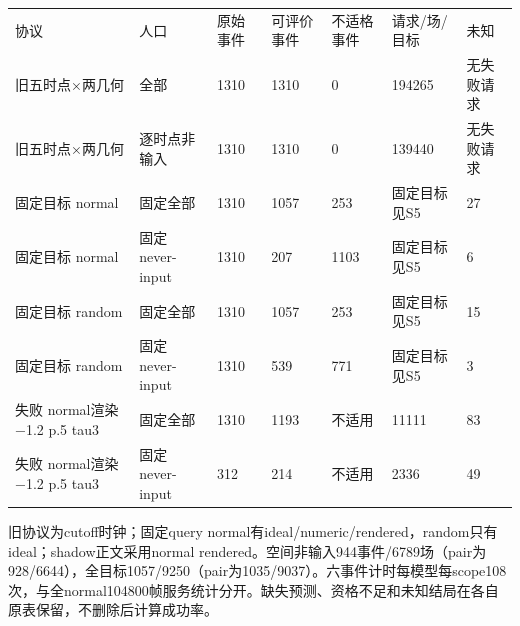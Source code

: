 \documentclass[UTF8,a4paper,11pt]{ctexart}
\begin{document}
\begin{longtable}{lllllll}
协议 & 人口 & 原始事件 & 可评价事件 & 不适格事件 & 请求/场/目标 & 未知 \\
旧五时点×两几何 & 全部 & 1310 & 1310 & 0 & 194265 & 无失败请求 \\
旧五时点×两几何 & 逐时点非输入 & 1310 & 1310 & 0 & 139440 & 无失败请求 \\
固定目标 normal & 固定全部 & 1310 & 1057 & 253 & 固定目标见S5 & 27 \\
固定目标 normal & 固定never-input & 1310 & 207 & 1103 & 固定目标见S5 & 6 \\
固定目标 random & 固定全部 & 1310 & 1057 & 253 & 固定目标见S5 & 15 \\
固定目标 random & 固定never-input & 1310 & 539 & 771 & 固定目标见S5 & 3 \\
失败 normal渲染 −1.2 p.5 tau3 & 固定全部 & 1310 & 1193 & 不适用 & 11111 & 83 \\
失败 normal渲染 −1.2 p.5 tau3 & 固定never-input & 312 & 214 & 不适用 & 2336 & 49 \\
\end{longtable}

旧协议为cutoff时钟；固定query normal有ideal/numeric/rendered，random只有ideal；shadow正文采用normal rendered。空间非输入944事件/6789场（pair为928/6644），全目标1057/9250（pair为1035/9037）。六事件计时每模型每scope108次，与全normal104800帧服务统计分开。缺失预测、资格不足和未知结局在各自原表保留，不删除后计算成功率。
\end{document}
